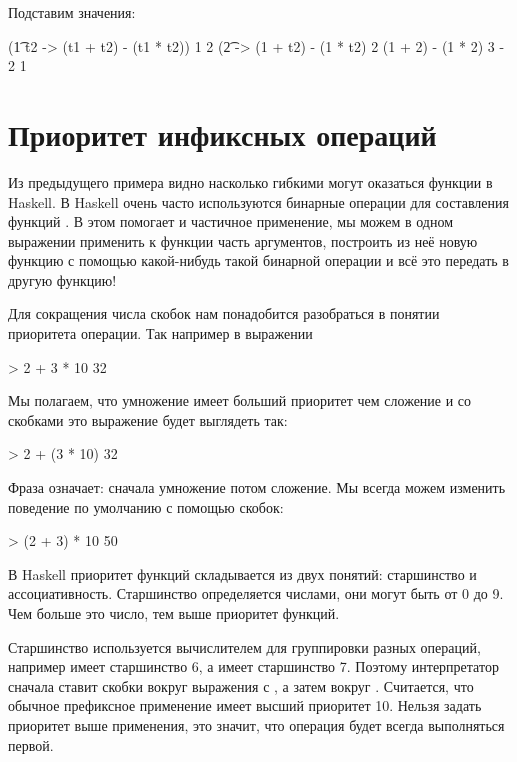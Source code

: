 Подставим значения:

\begin{code}
(\t1 t2 -> (t1 + t2) - (t1 * t2)) 1 2
(\t2 -> (1 + t2) - (1 * t2) 2
(1 + 2) - (1 * 2)
3 - 2
1
\end{code}

\section{Приоритет инфиксных операций}

Из предыдущего примера видно насколько гибкими могут оказаться
функции в Haskell. В Haskell очень часто используются 
бинарные операции для составления функций .
В этом помогает и частичное применение, мы можем в одном
выражении применить к функции часть аргументов, построить 
из неё новую функцию с помощью какой-нибудь такой бинарной
операции и всё это передать в другую функцию! 

Для сокращения числа скобок нам понадобится разобраться в
понятии приоритета операции. Так например в выражении 

\begin{code}
> 2 + 3 * 10
32
\end{code}

Мы полагаем, что умножение имеет больший приоритет чем
сложение и со скобками это выражение будет выглядеть так:

\begin{code}
> 2 + (3 * 10)
32
\end{code}

Фраза  означает: сначала умножение
потом сложение. Мы всегда можем изменить поведение по умолчанию
с помощью скобок:

\begin{code}
> (2 + 3) * 10
50
\end{code}

В Haskell приоритет функций складывается из двух понятий:
старшинство и ассоциативность. Старшинство определяется числами,
они могут быть от 0 до 9. Чем больше это число, тем выше приоритет
функций. 

Старшинство используется вычислителем для группировки 
разных операций, например \In{(+)} имеет старшинство 6, а 
\In{(*)} имеет старшинство 7. Поэтому интерпретатор сначала
ставит скобки вокруг выражения с \In{(*)}, а затем вокруг \In{(+)}.
Считается, что обычное префиксное применение имеет высший приоритет 10.
Нельзя задать приоритет выше применения, это значит, что операция
 будет всегда выполняться первой.


